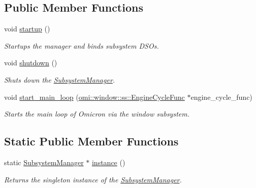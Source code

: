\subsection*{Public Member Functions}
\begin{DoxyCompactItemize}
\item 
void \hyperlink{classomi_1_1runtime_1_1ss_1_1_subsystem_manager_a18f996ef5f05428cc9cd083656dba0b9}{startup} ()
\begin{DoxyCompactList}\small\item\em Startups the manager and binds subsystem D\+S\+Os. \end{DoxyCompactList}\item 
void \hyperlink{classomi_1_1runtime_1_1ss_1_1_subsystem_manager_a9a74d6c9ecd6d5ea5fa13123f3861039}{shutdown} ()\hypertarget{classomi_1_1runtime_1_1ss_1_1_subsystem_manager_a9a74d6c9ecd6d5ea5fa13123f3861039}{}\label{classomi_1_1runtime_1_1ss_1_1_subsystem_manager_a9a74d6c9ecd6d5ea5fa13123f3861039}

\begin{DoxyCompactList}\small\item\em Shuts down the \hyperlink{classomi_1_1runtime_1_1ss_1_1_subsystem_manager}{Subsystem\+Manager}. \end{DoxyCompactList}\item 
void \hyperlink{classomi_1_1runtime_1_1ss_1_1_subsystem_manager_a61e2c524d885e5338f066424f76c0ae3}{start\+\_\+main\+\_\+loop} (\hyperlink{namespaceomi_1_1window_1_1ss_af42d2464a170bdfd876a35b9fde16137}{omi\+::window\+::ss\+::\+Engine\+Cycle\+Func} $\ast$engine\+\_\+cycle\+\_\+func)\hypertarget{classomi_1_1runtime_1_1ss_1_1_subsystem_manager_a61e2c524d885e5338f066424f76c0ae3}{}\label{classomi_1_1runtime_1_1ss_1_1_subsystem_manager_a61e2c524d885e5338f066424f76c0ae3}

\begin{DoxyCompactList}\small\item\em Starts the main loop of Omicron via the window subsystem. \end{DoxyCompactList}\end{DoxyCompactItemize}
\subsection*{Static Public Member Functions}
\begin{DoxyCompactItemize}
\item 
static \hyperlink{classomi_1_1runtime_1_1ss_1_1_subsystem_manager}{Subsystem\+Manager} $\ast$ \hyperlink{classomi_1_1runtime_1_1ss_1_1_subsystem_manager_aa676ace84e925dbebadbbb1d56ea961d}{instance} ()\hypertarget{classomi_1_1runtime_1_1ss_1_1_subsystem_manager_aa676ace84e925dbebadbbb1d56ea961d}{}\label{classomi_1_1runtime_1_1ss_1_1_subsystem_manager_aa676ace84e925dbebadbbb1d56ea961d}

\begin{DoxyCompactList}\small\item\em Returns the singleton instance of the \hyperlink{classomi_1_1runtime_1_1ss_1_1_subsystem_manager}{Subsystem\+Manager}. \end{DoxyCompactList}\end{DoxyCompactItemize}


